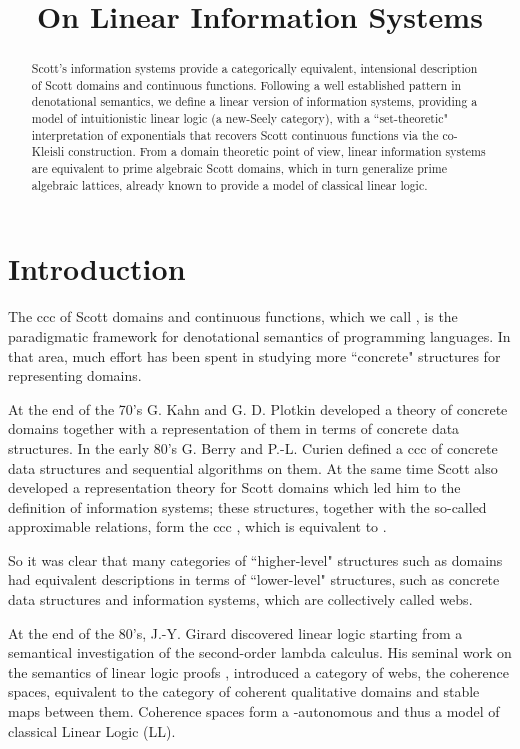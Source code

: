 \documentclass[copyright,creativecommons]{eptcs}
\title{On Linear Information Systems}
\author{

\institute{ Univerist\'{e} Paris Diderot \\ Paris, France}
\institute{Preuves Programmes et Syst\`{e}mes}
\email{Antonio.Bucciarelli@pps.jussieu.fr}
\and
 \qquad\qquad
\institute{ Univerist\`{a} Ca' Foscari \\ Venice, Italy}
\institute{Dipartimento di Informatica}
\email{acarraro@dsi.unive.it}
\and
 \qquad\qquad
\email{Thomas.Ehrhard@pps.jussieu.fr}
\and

\email{salibra@dsi.unive.it}
}
\begin{document}
\maketitle

\begin{abstract}
Scott's information systems provide a categorically equivalent, intensional description of Scott domains and continuous functions. Following a well established pattern in denotational semantics, we define a linear version of information systems, providing a model of intuitionistic linear logic (a new-Seely category), with a ``set-theoretic" interpretation of exponentials that recovers  Scott continuous functions via the co-Kleisli construction. From a domain theoretic point of view, linear information systems are equivalent to prime algebraic Scott domains, which in turn generalize prime algebraic lattices, already known to provide a model of classical linear
logic. \end{abstract}

\section{Introduction}



The ccc of Scott domains and continuous functions, which we call , is the paradigmatic framework for denotational semantics of programming languages. In that area, much effort has been spent in studying more ``concrete" structures for representing domains. 

At the end of the 70's G. Kahn and G. D. Plotkin \cite{Kahn78} developed a theory of concrete domains together with a representation of them in terms of concrete data structures. In the early 80's G. Berry and P.-L. Curien \cite{Berry82} defined a ccc of concrete data structures and sequential algorithms on them. At the same time  Scott \cite{Scott82} also developed a representation theory for Scott domains which led him to the definition of information systems; these structures, together with the so-called approximable relations, form the ccc , which is equivalent to .

So it was clear that many categories of ``higher-level" structures such as domains had equivalent descriptions in terms of ``lower-level" structures, such as concrete data structures and information systems, which are collectively called webs.

At the end of the 80's, J.-Y. Girard \cite{Girard86} discovered linear logic starting from a semantical investigation of the second-order lambda calculus. His seminal work on the semantics of linear logic proofs \cite{Girard87, Girard88}, introduced a category of webs, the coherence spaces, equivalent to the category of coherent qualitative domains and stable maps between them. Coherence spaces form a -autonomous and thus a model of classical Linear Logic (LL).
\end{document}
